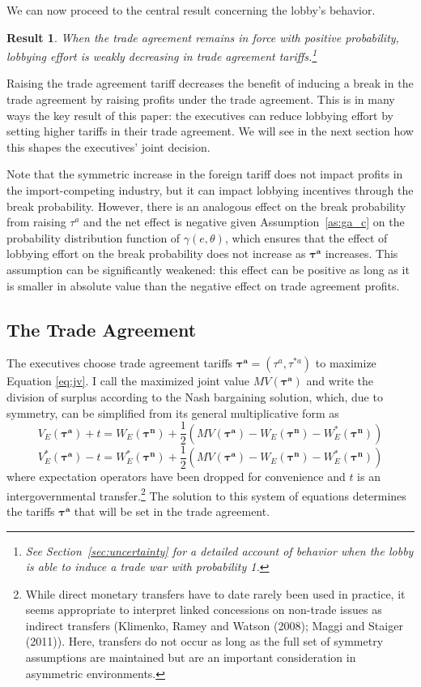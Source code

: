 \documentclass[10pt]{article}
\newtheorem{result}{Result}
\newcommand{\ta}{\theta}
\newcommand{\bta}{\bm{\tau^a}}
\newcommand{\btn}{\bm{\tau^n}}
\newcommand{\ga}{\gamma}
\begin{document}
We can now proceed to the central result concerning the lobby's behavior. 
\begin{result}
  When the trade agreement remains in force with positive probability, lobbying effort is weakly decreasing in trade agreement tariffs.\footnote{See Section~\ref{sec:uncertainty} for a detailed account of behavior when the lobby is able to induce a trade war with probability 1.}
  \label{res:lobby}
\end{result}

\noindent Raising the trade agreement tariff decreases the benefit of inducing a break in the trade agreement by raising profits under the trade agreement. This is in many ways the key result of this paper: the executives can reduce lobbying effort by setting higher tariffs in their trade agreement. We will see in the next section how this shapes the executives' joint decision. 

Note that the symmetric increase in the foreign tariff does not impact profits in the import-competing industry, but it can impact lobbying incentives through the break probability. However, there is an analogous effect on the break probability from raising $\tau^a$ and the net effect is negative given Assumption~\ref{as:ga_c} on the probability distribution function of $\ga(e,\ta)$, which ensures that the effect of lobbying effort on the break probability does not increase as $\bta$ increases. This assumption can be significantly weakened: this effect can be positive as long as it is smaller in absolute value than the negative effect on trade agreement profits.



\subsection{The Trade Agreement}
\label{sec:ta}
The executives choose trade agreement tariffs $\bta=\left(\tau^a,\tau^{*a} \right)$ to maximize Equation \ref{eq:jv}. I call the maximized joint value $MV(\bta)$ and write the division of surplus according to the Nash bargaining solution, which, due to symmetry, can be simplified from its general multiplicative form as
\[
  V_E(\bta) + t = W_E(\btn) + \frac{1}{2} \left( MV(\bta) - W_E(\btn) - W_E^*(\btn) \right)
\]
\[
  V_E^*(\bta) - t = W_E^*(\btn) + \frac{1}{2} \left( MV(\bta) - W_E(\btn) - W_E^*(\btn) \right)
\]
where expectation operators have been dropped for convenience and $t$ is an intergovernmental transfer.\footnote{While direct monetary transfers have to date rarely been used in practice, it seems appropriate to interpret linked concessions on non-trade issues as indirect transfers (Klimenko, Ramey and Watson (2008); Maggi and Staiger (2011)). Here, transfers do not occur as long as the full set of symmetry assumptions are maintained but are an important consideration in asymmetric environments.} The solution to this system of equations determines the tariffs $\bta$ that will be set in the trade agreement.
\end{document}
